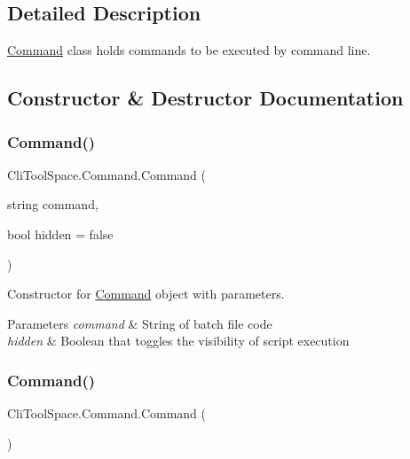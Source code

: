 \subsection{Detailed Description}
\mbox{\hyperlink{class_cli_tool_space_1_1_command}{Command}} class holds commands to be executed by command line. 



\subsection{Constructor \& Destructor Documentation}
\mbox{\label{class_cli_tool_space_1_1_command_ab93496803937b79918c2a63b15df7e4b}} 
\subsubsection{\texorpdfstring{Command()}{Command()}\hspace{0.1cm}{\footnotesize\ttfamily [1/2]}}
{\footnotesize\ttfamily Cli\+Tool\+Space.\+Command.\+Command (\begin{DoxyParamCaption}\item[{string}]{command,  }\item[{bool}]{hidden = {\ttfamily false} }\end{DoxyParamCaption})}



Constructor for \mbox{\hyperlink{class_cli_tool_space_1_1_command}{Command}} object with parameters. 


\begin{DoxyParams}{Parameters}
{\em command} & String of batch file code\\
\hline
{\em hidden} & Boolean that toggles the visibility of script execution\\
\hline
\end{DoxyParams}
\mbox{\label{class_cli_tool_space_1_1_command_af62f9e2db8cd415370496f8dbec63b0e}} 
\subsubsection{\texorpdfstring{Command()}{Command()}\hspace{0.1cm}{\footnotesize\ttfamily [2/2]}}
{\footnotesize\ttfamily Cli\+Tool\+Space.\+Command.\+Command (\begin{DoxyParamCaption}{ }\end{DoxyParamCaption})}



